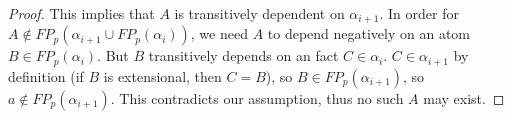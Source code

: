 \begin{proof}
This implies that $A$ is transitively dependent on $\alpha_{i+1}$.  In order
for $A \not\in FP_p(\alpha_{i+1} \cup FP_p(\alpha_i))$, we need $A$ to depend
negatively on an atom $B \in FP_p(\alpha_i)$.  But $B$ transitively depends on
an fact $C \in \alpha_i$.  $C \in \alpha_{i+1}$ by definition (if $B$ is
extensional, then $C=B$), so $B \in FP_p(\alpha_{i+1})$, so $a \not\in
FP_p(\alpha_{i+1})$.  This contradicts our assumption, thus no such $A$ may
exist.
\end{proof}

